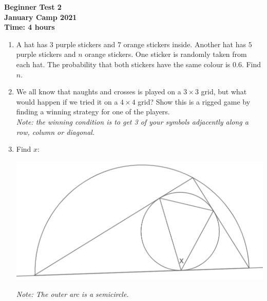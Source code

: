 \documentclass{article}
\begin{document}
\thispagestyle{empty}

\begin{center}
  \textbf{\Large Beginner Test 2}
  \\ \vspace{1em}
  \textbf{\large January Camp 2021}
  \\ \vspace{1em}
  \textbf{\large Time: 4 hours}
\end{center}

\vspace{24pt}

\begin{enumerate}[1.]


\item %
A hat has $3$ purple stickers and $7$ orange stickers inside. Another hat has $5$ purple stickers and $n$ orange stickers. One sticker is randomly taken from each hat. The probability that both stickers have the same colour is $0.6$. Find $n$.


\item %
We all know that naughts and crosses is played on a $3\times 3$ grid, but what would happen if we tried it on a $4\times 4$ grid? Show this is a rigged game by finding a winning strategy for one of the players.\\
\textit{Note: the winning condition is to get 3 of your symbols adjacently along a row, column or diagonal.}


\item %
Find $x$:
\begin{center}
\includegraphics[scale=0.4]{angle_diagram.png}
\end{center}
\textit{Note: The outer arc is a semicircle.}



\end{enumerate}
\end{document}
